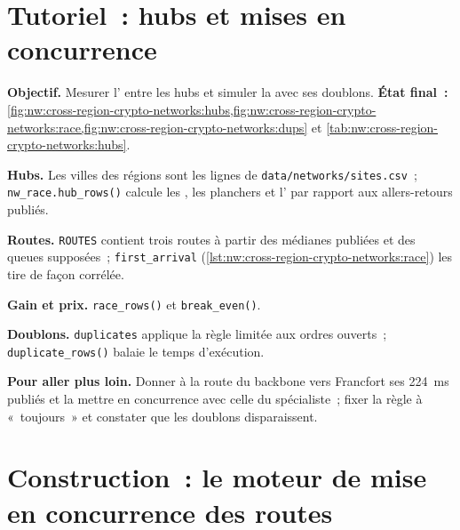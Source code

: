 \section{Tutoriel~: hubs et mises en concurrence}\label{tut:nw:cross-region-crypto-networks:tut}

\begin{tutorial}
\textbf{Objectif.} Mesurer l' entre les hubs et simuler la  avec ses doublons.
\textbf{État final~:} \cref{fig:nw:cross-region-crypto-networks:hubs,fig:nw:cross-region-crypto-networks:race,fig:nw:cross-region-crypto-networks:dups}
et \cref{tab:nw:cross-region-crypto-networks:hubs}.
\begin{tutsteps}
\item \textbf{Hubs.} Les villes des régions sont les lignes de \texttt{data/networks/sites.csv}~; \texttt{nw\_race.hub\_rows()} calcule les , les planchers et
  l' par rapport aux allers-retours publiés.
\item \textbf{Routes.} \texttt{ROUTES} contient trois routes à partir des médianes publiées et des queues supposées~; \texttt{first\_arrival}
  (\cref{lst:nw:cross-region-crypto-networks:race}) les tire de façon corrélée.
\item \textbf{Gain et prix.} \texttt{race\_rows()} et \texttt{break\_even()}.
\item \textbf{Doublons.} \texttt{duplicates} applique la règle limitée aux ordres ouverts~; \texttt{duplicate\_rows()} balaie le temps d'exécution.
\end{tutsteps}
\textbf{Pour aller plus loin.} Donner à la route du backbone vers Francfort ses 224~ms publiés et la mettre en concurrence avec celle du spécialiste~; fixer la règle à
«~toujours~» et constater que les doublons disparaissent.
\end{tutorial}

\section{Construction~: le moteur de mise en concurrence des routes}\label{bld:nw:cross-region-crypto-networks:routerace}

